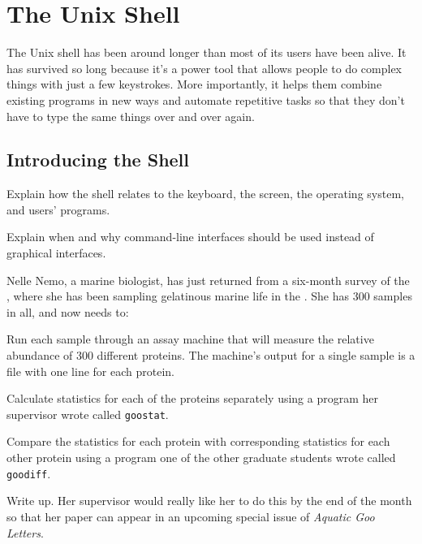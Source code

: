 \documentclass{book}
\begin{document}
\chapter{The Unix Shell}\label{s:shell}

The Unix shell has been around longer than most of its users have been
alive. It has survived so long because it's a power tool that allows
people to do complex things with just a few keystrokes. More
importantly, it helps them combine existing programs in new ways and
automate repetitive tasks so that they don't have to type the same
things over and over again.

\section{Introducing the Shell}

\begin{objectives}
\begin{swcitemize}
\item
  Explain how the shell relates to the keyboard, the screen, the
  operating system, and users' programs.
\item
  Explain when and why command-line interfaces should be used instead of
  graphical interfaces.
\end{swcitemize}
\end{objectives}

Nelle Nemo, a marine biologist, has just returned from a six-month
survey of the
, where she has been sampling gelatinous marine life in the
. She has 300 samples in all, and now needs to:

\begin{swcenumerate}
\item
  Run each sample through an assay machine that will measure the
  relative abundance of 300 different proteins. The machine's output for
  a single sample is a file with one line for each protein.
\item
  Calculate statistics for each of the proteins separately using a
  program her supervisor wrote called \texttt{goostat}.
\item
  Compare the statistics for each protein with corresponding statistics
  for each other protein using a program one of the other graduate
  students wrote called \texttt{goodiff}.
\item
  Write up. Her supervisor would really like her to do this by the end
  of the month so that her paper can appear in an upcoming special issue
  of \emph{Aquatic Goo Letters}.
\end{swcenumerate}
\end{document}
